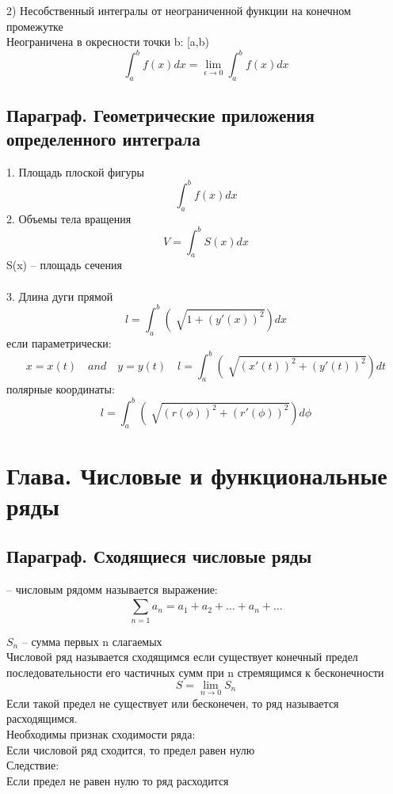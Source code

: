 \documentclass[a4paper, 12pt]{article}
\begin{document}
2) Несобственный интегралы от неограниченной функции на конечном промежутке\\
Неограничена в окресности точки b: [a,b)\\
\[
   \int_{a}^{b}f\left(x\right)dx = \lim_{ \epsilon   \to 0} \int_{a}^{b}f\left(x\right)dx  
 \] 
\subsection{Параграф. Геометрические приложения определенного интеграла}
1. Площадь плоской фигуры\\
\[
  \int_{a}^{b}f\left(x\right)dx 
\]
2. Объемы тела вращения\\
\[
  V = \int_{a}^{b}S\left(x\right)dx 
\]
S(x) -- площадь сечения\\\\
3. Длина дуги прямой\\
\[
  l = \int_{a}^{b}\left(\sqrt[]{1+(y'(x))^2}\right)dx 
\]
если параметрически:
\[
  x = x(t) \quad and \quad  y = y(t) \quad l = \int_{a}^{b}\left(\sqrt[]{(x'(t))^2 + (y'(t))^2}\right)dt 
\]
полярные координаты:
\[
  l = \int_{a}^{b}\left(\sqrt[]{(r(\phi))^2 + (r'(\phi))^2}\right)d\phi 
\]

\section{Глава. Числовые и функциональные ряды}
\subsection{Параграф. Сходящиеся числовые ряды}
-- числовым рядомм называется выражение:\\
\[
   \sum_{n=1}^{} a_n = a_1+a_2+\ldots+a_n+\ldots  
 \] 

$ S_n $ -- сумма первых n слагаемых \\

Числовой ряд называется сходящимся если существует конечный предел последовательности его частичных сумм при n стремящимся к бесконечности
\[
  S = \lim_{n\to 0} S_n
\]
Если такой предел не существует или бесконечен, то ряд называется расходящимся.\\

Необходимы признак сходимости ряда:\\
Если числовой ряд сходится, то предел равен нулю\\
Следствие:\\
Если предел не равен нулю то ряд расходится\\
\end{document}
